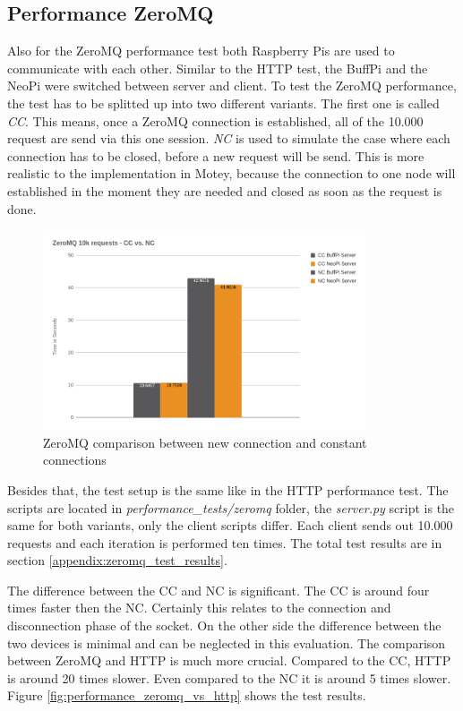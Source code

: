 \subsection{Performance ZeroMQ}
Also for the ZeroMQ performance test both Raspberry Pis are used to communicate with each other.
Similar to the \ac{HTTP} test, the BuffPi and the NeoPi were switched between server and client.
To test the ZeroMQ performance, the test has to be splitted up into two different variants.
The first one is called \textit{\ac{CC}}.
This means, once a ZeroMQ connection is established, all of the 10.000 request are send via this one session.
\textit{\ac{NC}} is used to simulate the case where each connection has to be closed, before a new request will be send.
This is more realistic to the implementation in Motey, because the connection to one node will established in the moment they are needed and closed as soon as the request is done.

\begin{figure}[H]
    \centering
    \includegraphics[width=0.85\textwidth]{resources/images/performance_zeromq_cc_vs_nc.png}
    \caption[ZeroMQ comparison between new connection and constant connections]{ZeroMQ comparison between new connection and constant connections}
    \label{fig:performance_zeromq_cc_vs_nc}
\end{figure}

Besides that, the test setup is the same like in the \ac{HTTP} performance test.
The scripts are located in \textit{performance\_tests/zeromq} folder, the \textit{server.py} script is the same for both variants, only the client scripts differ.
Each client sends out 10.000 requests and each iteration is performed ten times.
The total test results are in section \ref{appendix:zeromq_test_results}.\newline

The difference between the \ac{CC} and \ac{NC} is significant.
The \ac{CC} is around four times faster then the \ac{NC}.
Certainly this relates to the connection and disconnection phase of the socket.
On the other side the difference between the two devices is minimal and can be neglected in this evaluation.
The comparison between ZeroMQ and \ac{HTTP} is much more crucial.
Compared to the \ac{CC}, \ac{HTTP} is around 20 times slower.
Even compared to the \ac{NC} it is around 5 times slower.
Figure \ref{fig:performance_zeromq_vs_http} shows the test results.

